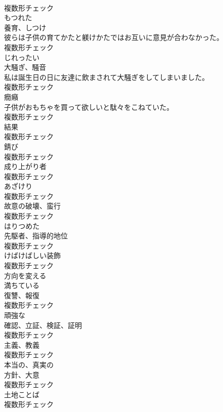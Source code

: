 \documentclass[8pt]{extreport}
\begin{document}
\begin{CJK}{UTF8}{min}
\\	複数形チェック
\\	[形容詞]	もつれた	
\\	[名詞]	養育、しつけ	
\\	彼らは子供の育てかたと躾けかたではお互いに意見が合わなかった。	
\\	複数形チェック
\\	[形容詞]	じれったい	
\\	[名詞]	大騒ぎ、騒音	
\\	私は誕生日の日に友達に飲まされて大騒ぎをしてしまいました。	
\\	複数形チェック
\\	[名詞]	癇癪	
\\	子供がおもちゃを買って欲しいと駄々をこねていた。	
\\	複数形チェック
\\	[名詞]	結果	
\\	複数形チェック
\\	[名詞]	錆び	
\\	複数形チェック
\\	[名詞]	成り上がり者	
\\	複数形チェック
\\	[名詞]	あざけり	
\\	複数形チェック
\\	[名詞]	故意の破壊、蛮行	
\\	複数形チェック
\\	[形容詞]	はりつめた	
\\	[名詞]	先駆者、指導的地位	
\\	複数形チェック
\\	[名詞]	けばけばしい装飾	
\\	複数形チェック
\\	[動詞]	方向を変える	
\\	[動詞]	満ちている	
\\	[名詞]	復讐、報復	
\\	複数形チェック
\\	[形容詞]	頑強な	
\\	[名詞]	確認、立証、検証、証明	
\\	複数形チェック
\\	[名詞]	主義、教義	
\\	複数形チェック
\\	[形容詞]	本当の、真実の	
\\	[名詞]	方針、大意	
\\	複数形チェック
\\	[名詞]	土地ことば	
\\	複数形チェック

\end{CJK}
\end{document}
